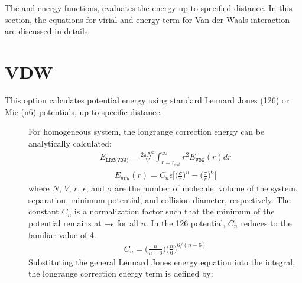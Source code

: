 \documentclass[letterpaper,10pt,english]{sphinxmanual}
\begin{document}
\sphinxAtStartPar
The  and  energy functions, evaluates the energy up to specified  distance. In this section, the  equations for virial and energy term
for Van der Waals interaction are discussed in details.


\section{VDW}
\label{\detokenize{long_range_correction:vdw}}
\sphinxAtStartPar
This option calculates potential energy using standard Lennard Jones (12\sphinxhyphen{}6) or Mie (n\sphinxhyphen{}6) potentials, up to specific  distance.
\begin{description}
\item[{}] \leavevmode
\sphinxAtStartPar
For homogeneous system, the long\sphinxhyphen{}range correction energy can be analytically calculated:
\begin{equation*}
\begin{split}E_{\texttt{LRC(VDW)}} = \frac{2\pi N^2}{V} \int_{r=r_{cut}}^{\infty} r^2 E_{\texttt{VDW}}(r) dr\end{split}
\end{equation*}\begin{equation*}
\begin{split}E_{\texttt{VDW}}(r) = C_{n} \epsilon \bigg[\bigg(\frac{\sigma}{r}\bigg)^{n} - \bigg(\frac{\sigma}{r}\bigg)^6\bigg]\end{split}
\end{equation*}
\sphinxAtStartPar
where \(N\), \(V\), \(r\), \(\epsilon\), and \(\sigma\) are the number of molecule, volume of the system, separation, minimum potential, and collision diameter, respectively.
The constant \(C_n\) is a normalization factor such that the minimum of the potential remains at \(-\epsilon\) for all \(n\). In the 12\sphinxhyphen{}6 potential, \(C_n\) reduces to the familiar value of 4.
\begin{equation*}
\begin{split}C_{n} = \bigg(\frac{n}{n - 6} \bigg)\bigg(\frac{n}{6} \bigg)^{6/(n - 6)}\end{split}
\end{equation*}
\sphinxAtStartPar
Substituting the general Lennard Jones energy equation into the integral, the long\sphinxhyphen{}range correction energy term is defined by:
\begin{equation*}

\end{equation*}
\end{description}
\end{document}
